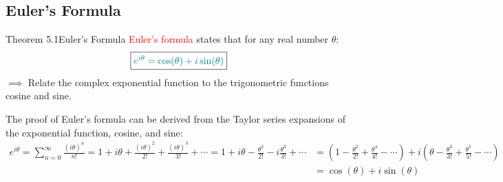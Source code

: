 \documentclass{book}
\begin{document}
\subsection{Euler's Formula}
\begin{thmBox}{Theorem 5.1}{Euler's Formula}
    \textcolor{red}{Euler's formula} states that for any real number $\theta$:
    \[
        \boxed{\textcolor{teal}{e^{i\theta} = \cos(\theta) + i\sin(\theta)}}
    \]
    $\implies$ Relate the complex exponential function to the trigonometric functions cosine and sine.
\end{thmBox}
The proof of Euler's formula can be derived from the Taylor series expansions of the exponential function, cosine, and sine:
\begin{align*}
    e^{i\theta} = \sum_{n=0}^{\infty} \frac{(i\theta)^n}{n!} = 1 + i\theta + \frac{(i\theta)^2}{2!} + \frac{(i\theta)^3}{3!} + \cdots = 1 + i\theta - \frac{\theta^2}{2!} - i\frac{\theta^3}{3!} + \cdots &= \left(1 - \frac{\theta^2}{2!} + \frac{\theta^4}{4!} - \cdots\right) + i\left(\theta - \frac{\theta^3}{3!} + \frac{\theta^5}{5!} - \cdots\right)\\
    &= \cos(\theta) + i\sin(\theta)
\end{align*}
\newpage
\end{document}

